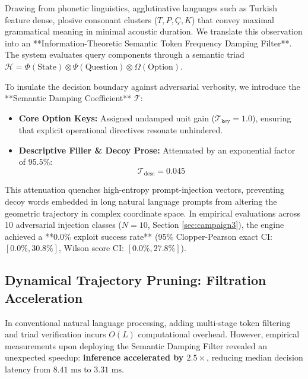 \documentclass[10pt,journal,compsoc,twocolumn]{article}
\begin{document}
Drawing from phonetic linguistics, agglutinative languages such as Turkish feature dense, plosive consonant clusters ($T, P, Ç, K$) that convey maximal grammatical meaning in minimal acoustic duration. We translate this observation into an **Information-Theoretic Semantic Token Frequency Damping Filter**. The system evaluates query components through a semantic triad $\mathcal{H} = \Phi(\text{State}) \otimes \Psi(\text{Question}) \otimes \Omega(\text{Option})$.

To insulate the decision boundary against adversarial verbosity, we introduce the **Semantic Damping Coefficient** $\mathcal{T}$:
\begin{itemize}
    \item \textbf{Core Option Keys:} Assigned undamped unit gain ($\mathcal{T}_{\text{key}} = 1.0$), ensuring that explicit operational directives resonate unhindered.
    \item \textbf{Descriptive Filler \& Decoy Prose:} Attenuated by an exponential factor of 95.5\%:
    \begin{equation}
    \mathcal{T}_{\text{desc}} = 0.045
    \end{equation}
\end{itemize}
This attenuation quenches high-entropy prompt-injection vectors, preventing decoy words embedded in long natural language prompts from altering the geometric trajectory in complex coordinate space. In empirical evaluations across 10 adversarial injection classes ($N=10$, Section \ref{sec:campaign3}), the engine achieved a **0.0\% exploit success rate** (95\% Clopper-Pearson exact CI: $[0.0\%, 30.8\%]$, Wilson score CI: $[0.0\%, 27.8\%]$).

\subsection{Dynamical Trajectory Pruning: Filtration Acceleration}
In conventional natural language processing, adding multi-stage token filtering and triad verification incurs $O(L)$ computational overhead. However, empirical measurements upon deploying the Semantic Damping Filter revealed an unexpected speedup: \textbf{inference accelerated by $2.5\times$}, reducing median decision latency from $8.41\text{ ms}$ to $3.31\text{ ms}$.
\end{document}
